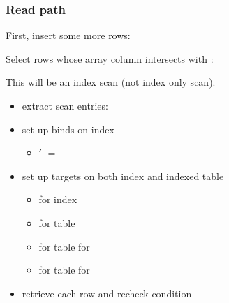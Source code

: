 \begin{frame}
  \frametitle{Read path}
  First, insert some more rows:


  \pause

  Select rows whose array column intersects with :


  This will be an index scan (not index only scan).
  \pause

  \begin{itemize}
    \item extract scan entries: 
    \pause
    \item set up binds on index
      \begin{itemize}
        \item {}$'$ $=$ 
      \end{itemize}
    \pause
    \item set up targets on both index and indexed table
      \begin{itemize}
        \item {} for index
        \pause
        \item {} for table
        \pause
        \item {} for table for 
        \pause
        \item {} for table for 
      \end{itemize}
    \pause
    \item retrieve each row and recheck condition
  \end{itemize}
\end{frame}
